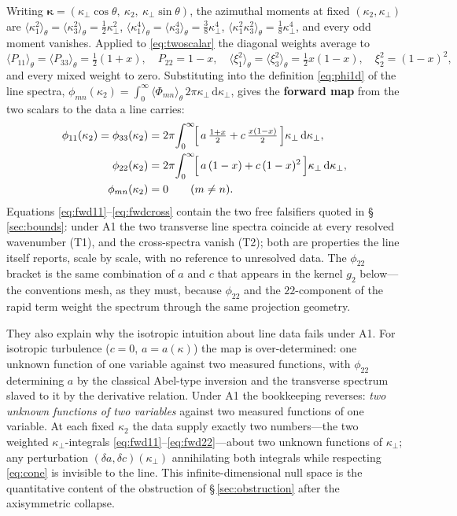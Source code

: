 \documentclass[lineno]{JFM-FLM_Au}
\begin{document}
Writing
$\boldsymbol{\kappa}=(\kappa_\perp\cos\theta,\ \kappa_2,\
\kappa_\perp\sin\theta)$, the azimuthal moments at fixed
$(\kappa_2,\kappa_\perp)$ are
$\langle\kappa_1^2\rangle_\theta=\langle\kappa_3^2\rangle_\theta
=\tfrac12\kappa_\perp^2$,
$\langle\kappa_1^4\rangle_\theta=\langle\kappa_3^4\rangle_\theta
=\tfrac38\kappa_\perp^4$,
$\langle\kappa_1^2\kappa_3^2\rangle_\theta=\tfrac18\kappa_\perp^4$, and
every odd moment vanishes. Applied to \eqref{eq:twoscalar} the diagonal
weights average to
\begin{equation}
  \langle P_{11}\rangle_\theta=\langle P_{33}\rangle_\theta
  =\tfrac12(1+x), \quad
  P_{22}=1-x, \quad
  \langle \xi_1^2\rangle_\theta=\langle \xi_3^2\rangle_\theta
  =\tfrac12 x(1-x), \quad
  \xi_2^2=(1-x)^2 ,
  \label{eq:azweights}
\end{equation}
and every mixed weight to zero. Substituting into the definition
\eqref{eq:phi1d} of the line spectra,
$\phi_{mn}(\kappa_2)=\int_0^\infty\langle\Phi_{mn}\rangle_\theta\,
2\pi\kappa_\perp\,\mathrm{d}\kappa_\perp$, gives the \textbf{forward map}
from the two scalars to the data a line carries:
\begin{align}
  \phi_{11}(\kappa_2)=\phi_{33}(\kappa_2)
  &= 2\pi\!\int_0^\infty\!
     \Bigl[\,a\,\tfrac{1+x}{2} + c\,\tfrac{x(1-x)}{2}\,\Bigr]
     \kappa_\perp\,\mathrm{d}\kappa_\perp ,
  \label{eq:fwd11}\\
  \phi_{22}(\kappa_2)
  &= 2\pi\!\int_0^\infty\!
     \Bigl[\,a\,(1-x) + c\,(1-x)^{2}\,\Bigr]
     \kappa_\perp\,\mathrm{d}\kappa_\perp ,
  \label{eq:fwd22}\\
  \phi_{mn}(\kappa_2) &= 0 \qquad (m\ne n).
  \label{eq:fwdcross}
\end{align}
Equations \eqref{eq:fwd11}--\eqref{eq:fwdcross} contain the two free
falsifiers quoted in \S\,\ref{sec:bounds}: under A1 the two transverse
line spectra coincide at every resolved wavenumber (T1), and the
cross-spectra vanish (T2); both are properties the line itself reports,
scale by scale, with no reference to unresolved data. The
$\phi_{22}$ bracket is the same combination of $a$ and $c$ that appears in
the kernel $g_2$ below---the conventions mesh, as they must, because
$\phi_{22}$ and the $22$-component of the rapid term weight the spectrum
through the same projection geometry.

They also explain why the isotropic intuition about line data fails under
A1. For isotropic turbulence ($c=0$, $a=a(\kappa)$) the map is
over-determined: one unknown function of one variable against two measured
functions, with $\phi_{22}$ determining $a$ by the classical Abel-type
inversion and the transverse spectrum slaved to it by the derivative
relation. Under A1 the bookkeeping reverses: \emph{two unknown functions
of two variables} against two measured functions of one variable. At each
fixed $\kappa_2$ the data supply exactly two numbers---the two weighted
$\kappa_\perp$-integrals \eqref{eq:fwd11}--\eqref{eq:fwd22}---about two
unknown functions of $\kappa_\perp$; any perturbation
$(\delta a,\delta c)(\kappa_\perp)$ annihilating both integrals while
respecting \eqref{eq:cone} is invisible to the line. This
infinite-dimensional null space is the quantitative content of the
obstruction of \S\,\ref{sec:obstruction} after the axisymmetric collapse.
\end{document}

